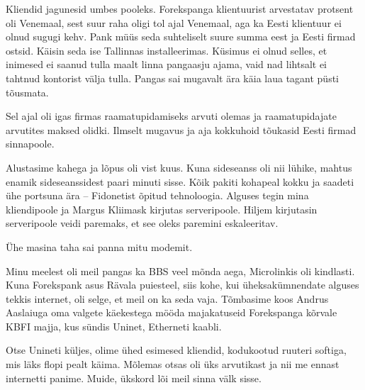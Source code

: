 
Kliendid jagunesid umbes pooleks. Forekspanga klientuurist arvestatav 
protsent oli Venemaal, sest suur 
raha oligi tol ajal Venemaal, aga ka Eesti klientuur ei olnud sugugi kehv. Pank 
müüs seda suhteliselt suure summa eest ja Eesti firmad 
ostsid. Käisin seda ise Tallinnas installeerimas. Küsimus ei olnud 
selles, et inimesed ei saanud tulla maalt linna pangaasju ajama, vaid nad 
lihtsalt ei tahtnud kontorist välja tulla. Pangas sai mugavalt ära käia 
laua tagant püsti tõusmata.


Sel ajal oli igas firmas raamatupidamiseks arvuti olemas ja raamatupidajate 
arvutites maksed olidki. Ilmselt mugavus ja aja kokkuhoid tõukasid
Eesti firmad sinnapoole.


Alustasime kahega ja lõpus oli vist kuus. Kuna 
sideseanss oli nii lühike, mahtus enamik sideseanssidest paari minuti 
sisse. Kõik pakiti kohapeal kokku ja saadeti ühe portsuna ära -- Fidonetist õpitud tehnoloogia. Alguses tegin mina kliendipoole ja 
Margus Kliimask kirjutas serveripoole. Hiljem kirjutasin serveripoole veidi paremaks, et see oleks paremini eskaleeritav.


Ühe masina taha sai panna mitu modemit.


Minu meelest oli meil pangas ka BBS veel mõnda aega, 
Microlinkis oli kindlasti. Kuna Forekspank asus Rävala puiesteel, siis kohe, kui 
üheksakümnendate alguses tekkis internet, oli selge, et meil on ka 
seda vaja. Tõmbasime koos Andrus Aaslaiuga oma valgete käekestega mööda majakatuseid Forekspanga kõrvale KBFI majja, 
kus sündis Uninet, Etherneti kaabli.


Otse Unineti küljes, olime ühed esimesed kliendid, kodukootud 
ruuteri softiga, mis läks flopi pealt käima. Mõlemas otsas oli üks 
arvutikast ja nii me ennast internetti panime. Muide, ükskord 
lõi meil sinna välk sisse.

